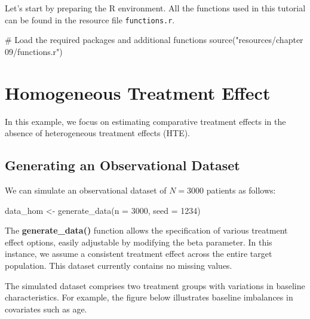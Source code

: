 \documentclass[
  letterpaper,
  DIV=11,
  numbers=noendperiod]{scrreprt}
\newenvironment{Shaded}{\begin{snugshade}}{\end{snugshade}}
\newcommand{\AttributeTok}[1]{\textcolor[rgb]{0.40,0.45,0.13}{#1}}
\newcommand{\CommentTok}[1]{\textcolor[rgb]{0.37,0.37,0.37}{#1}}
\newcommand{\DecValTok}[1]{\textcolor[rgb]{0.68,0.00,0.00}{#1}}
\newcommand{\FunctionTok}[1]{\textcolor[rgb]{0.28,0.35,0.67}{#1}}
\newcommand{\NormalTok}[1]{\textcolor[rgb]{0.00,0.23,0.31}{#1}}
\newcommand{\OtherTok}[1]{\textcolor[rgb]{0.00,0.23,0.31}{#1}}
\newcommand{\StringTok}[1]{\textcolor[rgb]{0.13,0.47,0.30}{#1}}
\begin{document}
Let's start by preparing the R environment. All the functions used in
this tutorial can be found in the resource file \texttt{functions.r}.

\begin{Shaded}
\begin{Highlighting}[]
\CommentTok{\# Load the required packages and additional functions}
\FunctionTok{source}\NormalTok{(}\StringTok{"resources/chapter 09/functions.r"}\NormalTok{) }
\end{Highlighting}
\end{Shaded}

\hypertarget{homogeneous-treatment-effect}{%
\section{Homogeneous Treatment
Effect}\label{homogeneous-treatment-effect}}

In this example, we focus on estimating comparative treatment effects in
the absence of heterogeneous treatment effects (HTE).

\hypertarget{generating-an-observational-dataset}{%
\subsection{Generating an Observational
Dataset}\label{generating-an-observational-dataset}}

We can simulate an observational dataset of \(N = 3000\) patients as
follows:

\begin{Shaded}
\begin{Highlighting}[]
\NormalTok{data\_hom }\OtherTok{\textless{}{-}} \FunctionTok{generate\_data}\NormalTok{(}\AttributeTok{n =} \DecValTok{3000}\NormalTok{, }\AttributeTok{seed =} \DecValTok{1234}\NormalTok{) }
\end{Highlighting}
\end{Shaded}

The \textbf{generate\_data()} function allows the specification of
various treatment effect options, easily adjustable by modifying the
beta parameter. In this instance, we assume a consistent treatment
effect across the entire target population. This dataset currently
contains no missing values.

The simulated dataset comprises two treatment groups with variations in
baseline characteristics. For example, the figure below illustrates
baseline imbalances in covariates such as age.
\end{document}
